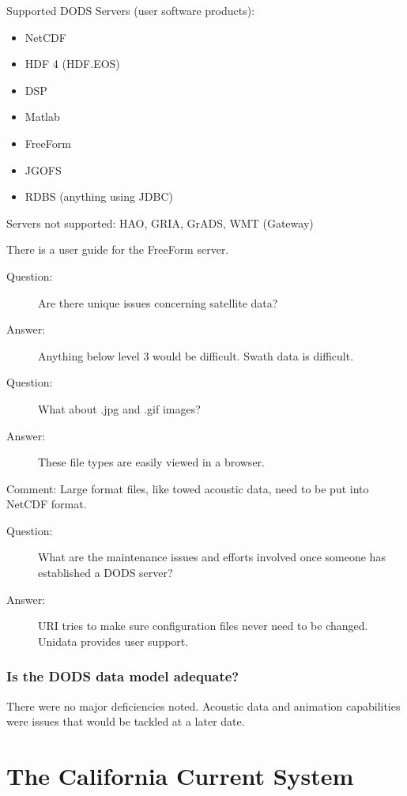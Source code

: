 Supported DODS Servers (user software products):
\begin{itemize}
\item NetCDF
\item HDF 4 (HDF.EOS)
\item DSP
\item Matlab
\item FreeForm
\item JGOFS
\item RDBS (anything using JDBC)
\end{itemize}

Servers not supported:
HAO, GRIA, GrADS, WMT (Gateway)

There is a user guide for the FreeForm server.

\begin{description}
\item[Question:]  Are there unique issues concerning satellite data?
\item[Answer:] Anything below level 3 would be difficult.  Swath data
  is difficult.
  
\item[Question:] What about .jpg and .gif images?
\item[Answer:] These file types are easily viewed in a browser.
\end{description}

Comment:
Large format files, like towed acoustic data, need to be put into NetCDF format.

\begin{description}
\item[Question:] What are the maintenance issues and efforts involved
  once someone has established a DODS server?
\item[Answer:] URI tries to make sure configuration files never need
  to be changed.  Unidata provides user support.
\end{description}

\subsubsection{Is the DODS data model adequate?}

There were no major deficiencies noted.  Acoustic data and animation
capabilities were issues that would be tackled at a later date.

\section{The California Current System}

